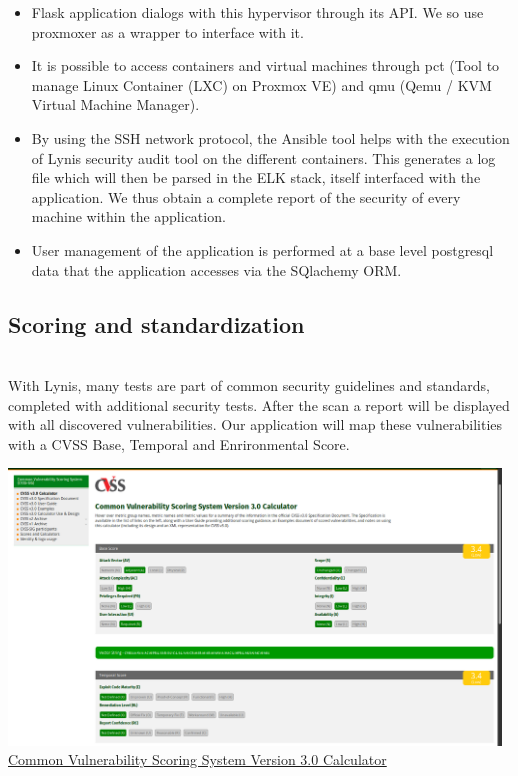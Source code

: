 \begin{itemize}
\item
  Flask application dialogs with this hypervisor through its API. We
  so use proxmoxer as a wrapper to interface with
  it.
\item
  It is possible to access containers and virtual machines through
  pct (Tool to manage Linux Container (LXC) on Proxmox VE) and
  qmu (Qemu / KVM Virtual Machine Manager).
\item
  By using the SSH network protocol, the Ansible tool helps with the execution of
  Lynis security audit tool on the different containers. This generates a
  log file which will then be parsed in the ELK stack, itself
  interfaced with the application. We thus obtain a complete report of the
  security of every machine within the application.
\item
  User management of the application is performed at a base level
  postgresql data that the application accesses via the SQlachemy ORM.
\end{itemize}


\pagebreak

\subsection{Scoring and standardization}

\vspace{1cm}
\\
With Lynis, many tests are part of common security guidelines and standards,
completed with additional security tests. After the scan a report will be displayed
with all discovered vulnerabilities. Our application will map these vulnerabilities with a CVSS Base, Temporal and Enrironmental Score.

\vspace{0.2cm}
\begin{center}
\includegraphics[width=0.98\textwidth]{images/cvss.png}
\\
\underline{Common Vulnerability Scoring System Version 3.0 Calculator}
\end{center}

